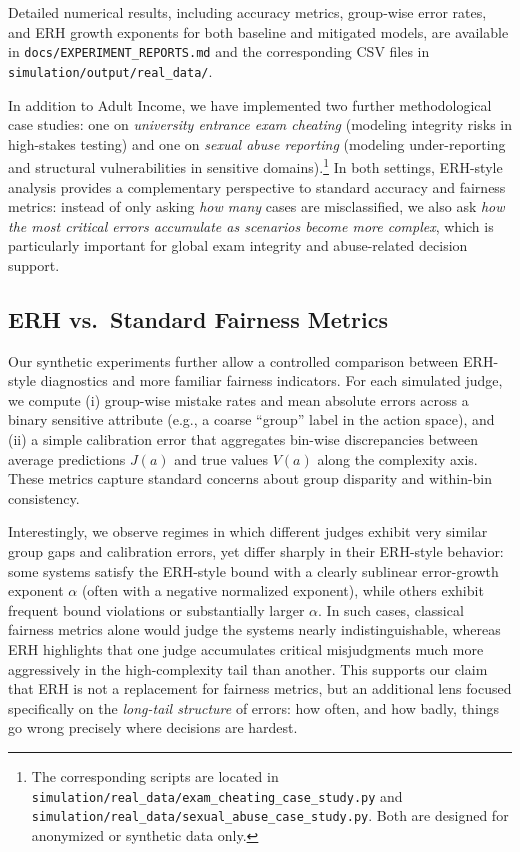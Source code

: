 \documentclass[12pt,a4paper]{article}
\theoremstyle{definition}
\theoremstyle{remark}
\begin{document}
Detailed numerical results, including accuracy metrics, group-wise error rates, and ERH growth exponents for both baseline and mitigated models, are available in \texttt{docs/EXPERIMENT\_REPORTS.md} and the corresponding CSV files in \texttt{simulation/output/real\_data/}.

In addition to Adult Income, we have implemented two further methodological case studies: one on \emph{university entrance exam cheating} (modeling integrity risks in high-stakes testing) and one on \emph{sexual abuse reporting} (modeling under-reporting and structural vulnerabilities in sensitive domains).\footnote{The corresponding scripts are located in \texttt{simulation/real\_data/exam\_cheating\_case\_study.py} and \texttt{simulation/real\_data/sexual\_abuse\_case\_study.py}. Both are designed for anonymized or synthetic data only.}
In both settings, ERH-style analysis provides a complementary perspective to standard accuracy and fairness metrics: instead of only asking \emph{how many} cases are misclassified, we also ask \emph{how the most critical errors accumulate as scenarios become more complex}, which is particularly important for global exam integrity and abuse-related decision support.

\subsection{ERH vs.\ Standard Fairness Metrics}

Our synthetic experiments further allow a controlled comparison between ERH-style diagnostics and more familiar fairness indicators. For each simulated judge, we compute (i) group-wise mistake rates and mean absolute errors across a binary sensitive attribute (e.g., a coarse ``group'' label in the action space), and (ii) a simple calibration error that aggregates bin-wise discrepancies between average predictions $J(a)$ and true values $V(a)$ along the complexity axis. These metrics capture standard concerns about group disparity and within-bin consistency.

Interestingly, we observe regimes in which different judges exhibit very similar group gaps and calibration errors, yet differ sharply in their ERH-style behavior: some systems satisfy the ERH-style bound with a clearly sublinear error-growth exponent $\alpha$ (often with a negative normalized exponent), while others exhibit frequent bound violations or substantially larger $\alpha$. In such cases, classical fairness metrics alone would judge the systems nearly indistinguishable, whereas ERH highlights that one judge accumulates critical misjudgments much more aggressively in the high-complexity tail than another. This supports our claim that ERH is not a replacement for fairness metrics, but an additional lens focused specifically on the \emph{long-tail structure} of errors: how often, and how badly, things go wrong precisely where decisions are hardest.
\end{document}
